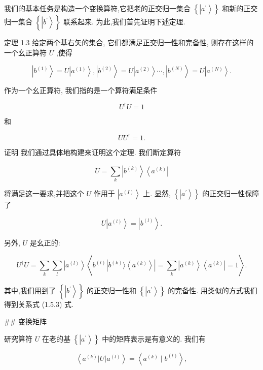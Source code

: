 \documentclass[lang=cn,newtx,10pt,scheme=chinese,thmcnt=section]{elegantbook}
\begin{document}
我们的基本任务是构造一个变换算符,它把老的正交归一集合 $\left\{ \left| {a}^{\prime }\right\rangle \right\}$ 和新的正交归一集合 $\left\{ \left| {b}^{\prime }\right\rangle \right\}$ 联系起来. 为此,我们首先证明下述定理.

定理 1.3 给定两个基右矢的集合, 它们都满足正交归一性和完备性, 则存在这样的一个幺正算符 $U$ ,使得

$$
\left| {b}^{\left( 1\right) }\right\rangle = U\left| {a}^{\left( 1\right) }\right\rangle ,\left| {b}^{\left( 2\right) }\right\rangle = U\left| {a}^{\left( 2\right) }\right\rangle \cdots ,\left| {b}^{\left( N\right) }\right\rangle = U\left| {a}^{\left( N\right) }\right\rangle . \tag{1.5.1}
$$

作为一个幺正算符, 我们指的是一个算符满足条件

$$
{U}^{ \dagger }U = 1 \tag{1.5.2}
$$

和

$$
U{U}^{ \dagger } = 1\text{.} \tag{1.5.3}
$$

证明 我们通过具体地构建来证明这个定理. 我们断定算符

$$
U = \mathop{\sum }\limits_{k}\left| {b}^{\left( k\right) }\right\rangle \left\langle {a}^{\left( k\right) }\right| \tag{1.5.4}
$$

将满足这一要求,并把这个 $U$ 作用于 $\left| {a}^{\left( I\right) }\right\rangle$ 上. 显然, $\left\{ \left| {a}^{\prime }\right\rangle \right\}$ 的正交归一性保障了

$$
U\left| {a}^{\left( l\right) }\right\rangle = \left| {b}^{\left( l\right) }\right\rangle . \tag{1.5.5}
$$

另外, $U$ 是幺正的:

$$
{U}^{ \dagger }U = \mathop{\sum }\limits_{k}\mathop{\sum }\limits_{l}\left| {a}^{\left( l\right) }\right\rangle \left\langle {{b}^{\left( l\right) }\left| {{b}^{\left( k\right) }\rangle \left\langle {a}^{\left( k\right) }\right\rangle }\right| = \mathop{\sum }\limits_{k}\left| {a}^{\left( k\right) }\right\rangle \left\langle {a}^{\left( k\right) }\right| = 1}\right\rangle . \tag{1.5.6}
$$

其中,我们用到了 $\left\{ \left| {b}^{\prime }\right\rangle \right\}$ 的正交归一性和 $\left\{ \left| {a}^{\prime }\right\rangle \right\}$ 的完备性. 用类似的方式我们得到关系式 (1.5.3) 式.

## 变换矩阵

研究算符 $U$ 在老的基 $\left\{ \left| {a}^{\prime }\right\rangle \right\}$ 中的矩阵表示是有意义的. 我们有

$$
\left\langle {{a}^{\left( k\right) }\left| U\right| {a}^{\left( l\right) }}\right\rangle = \left\langle {{a}^{\left( k\right) } \mid {b}^{\left( l\right) }}\right\rangle , \tag{1.5.7}
$$
\end{document}
